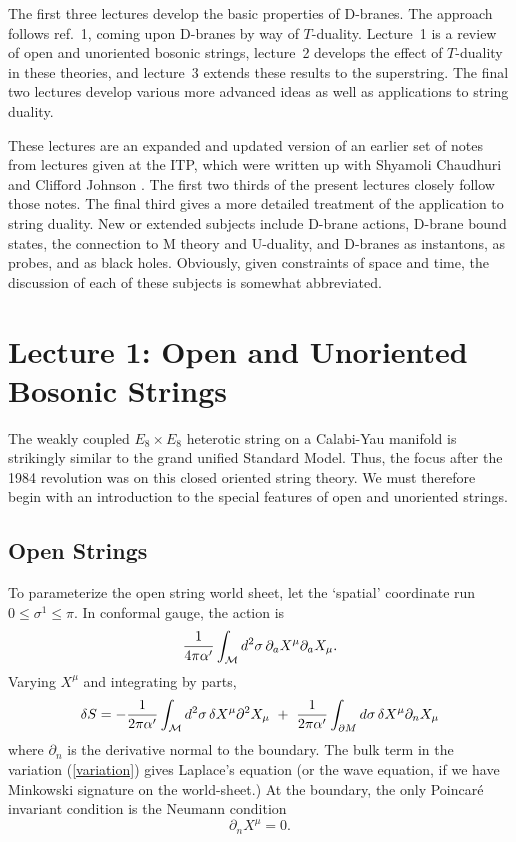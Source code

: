 \documentclass[12pt]{article}
\def\be{\begin{equation}}
\def\ee{\end{equation}}
\def\ap{\alpha'}
\begin{document}
The first three lectures develop the basic properties of D-branes.  The
approach follows ref.~1, coming upon D-branes by way of $T$-duality. 
Lecture~1
is a review of open and unoriented bosonic strings, lecture~2 develops the
effect of $T$-duality in these theories, and lecture~3 extends these results
to the superstring.  The final two lectures develop various more advanced
ideas as well as applications to string duality.

These lectures are an expanded and updated version of an earlier set of
notes from lectures given at the ITP, which were written up
with Shyamoli Chaudhuri and Clifford Johnson \cite{dnotes}.  The first two
thirds of the present lectures closely
follow those notes.  The final third gives a more detailed treatment of the
application to string duality.  New or extended subjects include D-brane
actions, D-brane bound states, the connection to M theory and U-duality, and
D-branes as instantons, as probes, and as black holes.  Obviously, given
constraints of space and time, the discussion of each of these subjects is
somewhat abbreviated.


\section{Lecture 1: Open and Unoriented Bosonic Strings}

The weakly coupled $E_8 \times E_8$ heterotic string on a Calabi-Yau
manifold is strikingly similar to the grand unified Standard Model. 
Thus, the focus after the 1984 revolution was on this closed
oriented string theory.  We must therefore begin with an introduction to the
special features of open and unoriented strings.

\subsection{Open Strings}

To parameterize the open string world sheet, let the `spatial' coordinate
run $0 \leq \sigma^1 \leq \pi$. 
In conformal gauge, the action is
\be
{1\over4\pi\ap} \int_{\cal M} d^2\sigma
\, \partial_a X^\mu \partial_a X_\mu.
\ee
Varying $X^\mu$ and integrating by parts,
\be
\delta S = -{1\over2\pi\ap} \int_{\cal M} d^2\sigma \, \delta
X^\mu \partial^2
X_\mu\ +\ {1\over2\pi\ap} \int_{\partial M}d\sigma \, \delta
X^\mu \partial_n X_\mu \label{variation}
\ee
where $\partial_n$ is the derivative normal to the boundary.
The bulk term in the variation (\ref{variation}) gives
Laplace's equation (or the wave equation, if we have Minkowski signature on the
world-sheet.)
At the boundary, the only Poincar\'e invariant condition is the
Neumann condition
\be
\partial_n X^\mu=0. 
\ee  
\end{document}
